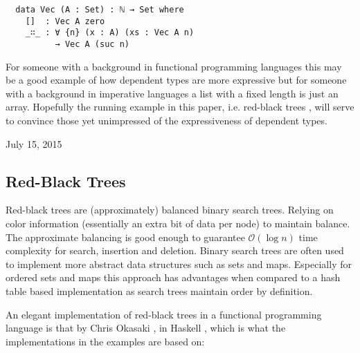 \documentclass[journal, retainorgcmds]{IEEEtran}
\begin{document}
\begin{verbatim}
  data Vec (A : Set) : ℕ → Set where
    []  : Vec A zero
    _∷_ : ∀ {n} (x : A) (xs : Vec A n)
          → Vec A (suc n)
\end{verbatim}

For someone with a background in functional programming languages this may be
a good example of how dependent types are more expressive but for someone with
a background in imperative languages a list with a fixed length is just an
array.
Hopefully the running example in this paper, i.e. red-black trees
\cite{rbtrees}, will serve to convince those yet unimpressed of the
expressiveness of dependent types.

\hfill July 15, 2015

\subsection{Red-Black Trees}

Red-black trees are (approximately) balanced binary search trees.
Relying on color information (essentially an extra bit of data per node) to
maintain balance.
The approximate balancing is good enough to guarantee $\mathcal{O}(\log{}n)$
time complexity for search, insertion and deletion.
Binary search trees are often used to implement more abstract data structures
such as sets and maps.
Especially for ordered sets and maps this approach has advantages when compared
to a hash table based implementation as search trees maintain order by
definition.

An elegant implementation of red-black trees in a functional programming
language is that by Chris Okasaki \cite{okasaki}, in Haskell \cite{haskell},
which is what the implementations in the examples are based on:
\end{document}
